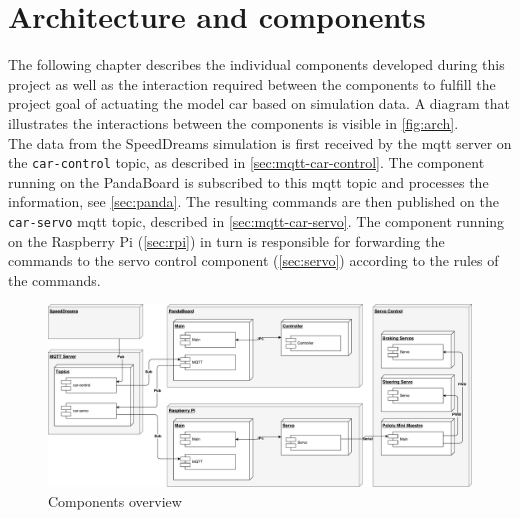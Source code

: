 \section{Architecture and components}
\label{sec:arch}
The following chapter describes the individual components developed during this project as well as the interaction required between the components to fulfill the project goal of actuating the model car based on simulation data. A diagram that illustrates the interactions between the components is visible in \autoref{fig:arch}. \\

The data from the SpeedDreams simulation is first received by the mqtt server on the \texttt{car-control} topic, as described in \autoref{sec:mqtt-car-control}.
The component running on the PandaBoard is subscribed to this mqtt topic and processes the information, see \autoref{sec:panda}.
The resulting commands are then published on the \texttt{car-servo} mqtt topic, described in \autoref{sec:mqtt-car-servo}.
The component running on the Raspberry Pi (\autoref{sec:rpi}) in turn is responsible for forwarding the commands to the servo control component (\autoref{sec:servo}) according to the rules of the commands. \\

\begin{figure}[h]
    \centering
    \includegraphics[width=1\linewidth]{images/components}
    \caption{Components overview}
    \label{fig:arch}
\end{figure}

\newpage


\newpage

\newpage

